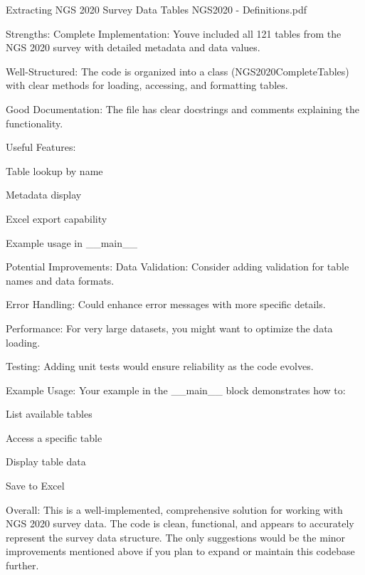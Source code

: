 \documentclass[
  11pt,
  a4paper,
]{article}
\newenvironment{Shaded}{\begin{snugshade}}{\end{snugshade}}
\newcommand{\CommentTok}[1]{\textcolor[rgb]{0.37,0.37,0.37}{#1}}
\begin{document}
\begin{Shaded}
\begin{Highlighting}[]
\CommentTok{\textquotesingle{}\textquotesingle{}\textquotesingle{}}
\CommentTok{Extracting NGS 2020 Survey Data Tables}
\CommentTok{NGS2020 {-} Definitions.pdf}
\CommentTok{\textquotesingle{}\textquotesingle{}\textquotesingle{}}

\CommentTok{\textquotesingle{}\textquotesingle{}\textquotesingle{}}
\CommentTok{Strengths:}
\CommentTok{Complete Implementation: You\textquotesingle{}ve included all 121 tables from the NGS 2020 survey with detailed metadata and data values.}

\CommentTok{Well{-}Structured: The code is organized into a class (NGS2020CompleteTables) with clear methods for loading, accessing, and formatting tables.}

\CommentTok{Good Documentation: The file has clear docstrings and comments explaining the functionality.}

\CommentTok{Useful Features:}

\CommentTok{Table lookup by name}

\CommentTok{Metadata display}

\CommentTok{Excel export capability}

\CommentTok{Example usage in \_\_main\_\_}

\CommentTok{Potential Improvements:}
\CommentTok{Data Validation: Consider adding validation for table names and data formats.}

\CommentTok{Error Handling: Could enhance error messages with more specific details.}

\CommentTok{Performance: For very large datasets, you might want to optimize the data loading.}

\CommentTok{Testing: Adding unit tests would ensure reliability as the code evolves.}

\CommentTok{Example Usage:}
\CommentTok{Your example in the \_\_main\_\_ block demonstrates how to:}

\CommentTok{List available tables}

\CommentTok{Access a specific table}

\CommentTok{Display table data}

\CommentTok{Save to Excel}

\CommentTok{Overall:}
\CommentTok{This is a well{-}implemented, comprehensive solution for working with NGS 2020 survey data. The code is clean, functional, and appears to accurately represent the survey data structure. The only suggestions would be the minor improvements mentioned above if you plan to expand or maintain this codebase further.}
\CommentTok{\textquotesingle{}\textquotesingle{}\textquotesingle{}}


\end{Highlighting}
\end{Shaded}
\end{document}
